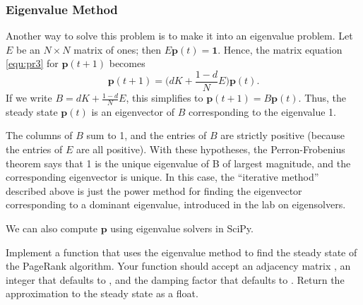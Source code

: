 \subsubsection*{Eigenvalue Method}
Another way to solve this problem is to make it into an eigenvalue problem.
Let $E$ be an $N \times N$ matrix of ones; then $E\mathbf{p}(t) = \mathbf{1}$.
Hence, the matrix equation \eqref{equ:pr3} for $\mathbf{p}(t+1)$ becomes
\[\mathbf{p}(t+1) = \Big(dK + \frac{1-d}{N}E\Big)\mathbf{p}(t).\]
If we write $B = dK + \frac{1-d}{N}E$, this simplifies to $\mathbf{p}(t+1) = B\mathbf{p}(t).$
Thus, the steady state $\mathbf{p}(t)$ is an eigenvector of $B$ corresponding to the eigenvalue 1.

The columns of $B$ sum to 1, and the entries of $B$ are strictly positive (because the entries of $E$ are all positive).
With these hypotheses, the Perron-Frobenius theorem says that 1 is the unique eigenvalue of B of largest magnitude, and the corresponding eigenvector is unique.
In this case, the ``iterative method'' described above is just the power method for finding the eigenvector corresponding to a dominant eigenvalue, introduced in the lab on eigensolvers. %

We can also compute $\mathbf{p}$ using eigenvalue solvers in SciPy.

\begin{problem}
Implement a function that uses the eigenvalue method to find the steady state of the PageRank algorithm. Your function should accept an adjacency matrix , an integer  that defaults to , and the damping factor  that defaults to . Return the approximation to the steady state as a float.
\begin{comment}
\begin{lstlisting}
def eig_solve( adj, N=None, d=.85):
    '''
    Return the page ranks of the network described by `adj`.

    INPUTS:
    adj - A NumPy array representing the adjacency matrix of a directed
            graph
    N     - Restrict the computation to the first `N` nodes of the graph.
            Defaults to N=None; in this case, the entire matrix is used.
    d     - The damping factor, a float between 0 and 1.
            Defaults to .85.

    OUTPUTS:
    Return the approximation to the steady state of p.
    '''
\end{lstlisting}
\end{comment}
\end{problem}

